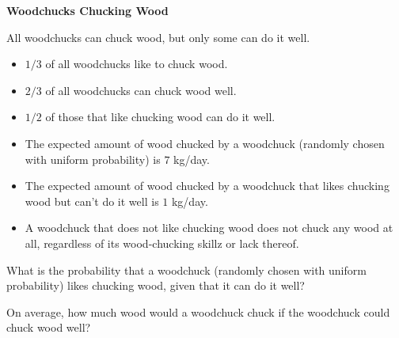 \documentclass[12pt,oneside]{article}
\newcommand{\ptitle}[1]{\textbf{\hspace{0.2cm}#1}}
\begin{document}
\instatements{\newpage}
\begin{problem}{25}\label{woodchuck} \ptitle{Woodchucks Chucking Wood}

All woodchucks can chuck wood, but only some can do it well.
\begin{itemize}
 \item $1/3$ of all woodchucks like to chuck wood.
 \item $2/3$ of all woodchucks can chuck wood well.
 \item $1/2$ of those that like chucking wood can do it well.
 \item The expected amount of wood chucked by a woodchuck (randomly chosen with uniform probability) is $7$ kg/day.
 \item The expected amount of wood chucked by a woodchuck that likes chucking wood but can't do it well is $1$ kg/day.
 \item A woodchuck that does not like chucking wood does not chuck any wood at all, regardless of its wood-chucking skillz or lack thereof.
\end{itemize}


\bparts

 What is the probability that a woodchuck (randomly chosen with uniform probability) likes chucking wood, given that it can do it well?



\instatements{\newpage}

 On average, how much wood would a woodchuck chuck if the woodchuck could chuck wood well?
\end{problem}
\end{document}
